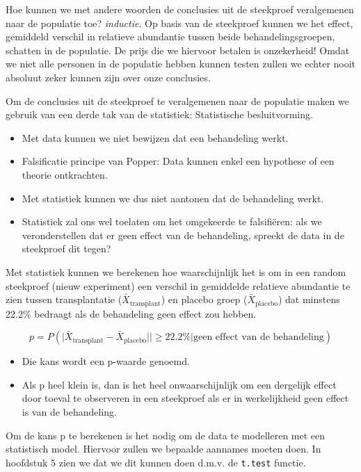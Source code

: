 \documentclass[
  12pt,dutch,coursenotes]{book}
\theoremstyle{definition}
\theoremstyle{definition}
\theoremstyle{definition}
\theoremstyle{remark}
\begin{document}
Hoe kunnen we met andere woorden de conclusies uit de steekproef veralgemenen naar de populatie toe? \emph{inductie}.
Op basis van de steekproef kunnen we het effect, gemiddeld verschil in relatieve abundantie tussen beide behandelingsgroepen, schatten in de populatie.
De prijs die we hiervoor betalen is onzekerheid!
Omdat we niet alle personen in de populatie hebben kunnen testen zullen we echter nooit absoluut zeker kunnen zijn over onze conclusies.

Om de conclusies uit de steekproef te veralgemenen naar de populatie maken we gebruik van een derde tak van de statistiek:
Statistische besluitvorming.

\begin{itemize}
\item
  Met data kunnen we niet bewijzen dat een behandeling werkt.
\item
  Falsificatie principe van Popper: Data kunnen enkel een hypothese of een theorie ontkrachten.
\item
  Met statistiek kunnen we dus niet aantonen dat de behandeling werkt.
\item
  Statistiek zal ons wel toelaten om het omgekeerde te falsifiëren: als we veronderstellen dat er geen effect van de behandeling, spreekt de data in de steekproef dit tegen?
\end{itemize}

Met statistiek kunnen we berekenen hoe waarschijnlijk het is om in een random steekproef (nieuw experiment) een verschil in gemiddelde relatieve abundantie te zien tussen transplantatie (\(\bar X_\text{transplant}\)) en placebo groep (\(\bar X_\text{placebo}\)) dat minstens 22.2\% bedraagt als de behandeling geen effect zou hebben.

\[p=P( \vert \bar X_\text{transplant}-\bar X_\text{placebo}\vert \vert \geq 22.2\% \vert \text{geen effect van de behandeling})\]

\begin{itemize}
\item
  Die kans wordt een p-waarde genoemd.
\item
  Als p heel klein is, dan is het heel onwaarschijnlijk om een dergelijk effect door toeval te observeren in een steekproef als er in werkelijkheid geen effect is van de behandeling.
\end{itemize}

Om de kans p te berekenen is het nodig om de data te modelleren met een statistisch model. Hiervoor zullen we bepaalde aannames moeten doen. In hoofdstuk 5 zien we dat we dit kunnen doen d.m.v. de \texttt{t.test} functie.
\end{document}
